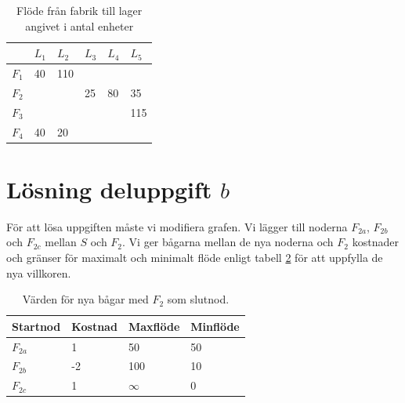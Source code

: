 \documentclass[titlepage, a4paper]{article}
\begin{document}
\begin{table}[h!]
    \centering
    \begin{tabular}{ | l | l | l | l | l | l | }
        \hline
        {} & {$L_{1}$} & {$L_{2}$} & {$L_{3}$} & {$L_{4}$} & {$L_{5}$} \\\hline
        {$F_{1}$} & {40} & {110} & {} & {} & {} \\\hline
        {$F_{2}$} & {} & {} & {25} & {80} & {35} \\\hline
        {$F_{3}$} & {} & {} & {} & {} & {115} \\\hline
        {$F_{4}$} & {40} & {20} & {} & {} & {} \\\hline
    \end{tabular}
    \caption{Flöde från fabrik till lager angivet i antal enheter} \label{uppgifta-flode}
\end{table}

\newpage

\section{Lösning deluppgift $b$}

För att lösa uppgiften måste vi modifiera grafen. Vi lägger till noderna $F_{2a}$, $F_{2b}$ och $F_{2c}$ mellan $S$ och $F_{2}$. Vi ger bågarna mellan de nya noderna och $F_{2}$ kostnader och gränser för maximalt och minimalt flöde enligt tabell \ref{uppgiftb-bagar} för att uppfylla de nya villkoren.

\begin{table}[h!]
    \centering
    \begin{tabular}{ | l | l | l | l | }
        \hline
        {\textbf{Startnod}} & {\textbf{Kostnad}} & {\textbf{Maxflöde}} & {\textbf{Minflöde}} \\\hline
        {$F_{2a}$} & {1} & {50} & {50} \\\hline
        {$F_{2b}$} & {-2} & {100} & {10} \\\hline
        {$F_{2c}$} & {1} & {$\infty$} & {0} \\\hline
    \end{tabular}
    \caption{Värden för nya bågar med $F_{2}$ som slutnod.} \label{uppgiftb-bagar}
\end{table}
\end{document}
